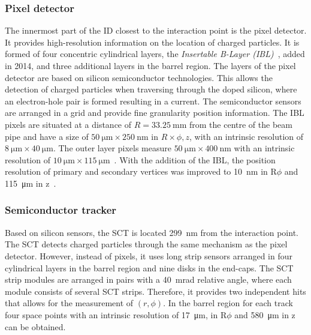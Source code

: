 \subsubsection{Pixel detector}
The innermost part of the ID closest to the interaction point is the pixel detector. It provides high-resolution information on the location of charged particles. It is formed of four concentric cylindrical layers, the \emph{Insertable B-Layer (IBL)}~\cite{ATLAS:IBL-TDR}, added in 2014, and three additional layers in the barrel region. The layers of the pixel detector are based on silicon semiconductor technologies. This allows the detection of charged particles when traversing through the doped silicon, where an electron-hole pair is formed resulting in a current. The semiconductor sensors are arranged in a grid and provide fine granularity position information. The IBL pixels are situated at a distance of $R = \SI{33.25}{\milli\meter}$ from the centre of the beam pipe and have a size of $\SI{50}{\micro\meter} \times \SI{250}{\nano\meter}$ in $R \times \phi, z$, with an intrinsic resolution of $\SI{8}{\micro\meter} \times \SI{40}{\micro\meter}$. The outer layer pixels measure $\SI{50}{\micro\meter} \times \SI{400}{\nano\meter}$ with an intrinsic resolution of $\SI{10}{\micro\meter} \times \SI{115}{\micro\meter}$~\cite{ATLAS:ID-TDR}. With the addition of the IBL, the position resolution of primary and secondary vertices was improved to \SI{10}{\nano\meter} in R$\phi$ and \SI{115}{\micro\meter} in z~\cite{Rosa}. 

\subsubsection{Semiconductor tracker}
Based on silicon sensors, the SCT is located \SI{299}{\nano\meter} from the interaction point. The SCT detects charged particles through the same mechanism as the pixel detector. However, instead of pixels, it uses long strip sensors arranged in four cylindrical layers in the barrel region and nine disks in the end-caps. The SCT strip modules are arranged in pairs with a \SI{40}{\milli\radian} relative angle, where each module consists of several SCT strips. Therefore, it provides two independent hits that allows for the measurement of $(r,\phi)$. In the barrel region for each track four space points with an intrinsic resolution of \SI{17}{\micro\meter}, in R$\phi$ and \SI{580}{\micro\meter} in z can be obtained.

